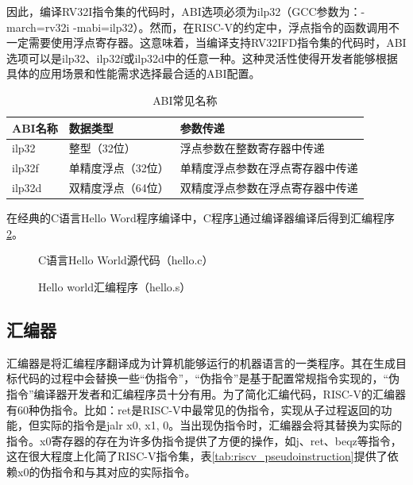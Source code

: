 因此，编译RV32I指令集的代码时，ABI选项必须为ilp32（GCC参数为：-march=rv32i -mabi=ilp32）。然而，在RISC-V的约定中，浮点指令的函数调用不一定需要使用浮点寄存器。这意味着，当编译支持RV32IFD指令集的代码时，ABI选项可以是ilp32、ilp32f或ilp32d中的任意一种。这种灵活性使得开发者能够根据具体的应用场景和性能需求选择最合适的ABI配置。

\begin{table}[htbp]
	\centering
	\caption{ABI常见名称}
	\begin{tabularx}{\textwidth}{>{\centering\arraybackslash}p{3cm} >{\centering\arraybackslash}p{5cm} >{\centering\arraybackslash}X}
		\toprule
		\textbf{ABI名称} & \textbf{数据类型} & \textbf{参数传递}    \\
		\midrule
		ilp32          & 整型（32位）       & 浮点参数在整数寄存器中传递    \\
		ilp32f         & 单精度浮点（32位）    & 单精度浮点参数在浮点寄存器中传递 \\
		ilp32d         & 双精度浮点（64位）    & 双精度浮点参数在浮点寄存器中传递 \\
		\bottomrule
	\end{tabularx}
	\label{tab:riscv_abi_state}
\end{table}

在经典的C语言Hello Word程序编译中，C程序\ref{fig:hello_c_example}通过编译器编译后得到汇编程序\ref{fig:hello_s_example}。

\begin{figure}[htbp]
	\centering
	
	\caption{C语言Hello World源代码（hello.c）}
	\label{fig:hello_c_example}
\end{figure}

\begin{figure}[htbp]
	\centering
	
	\caption{Hello world汇编程序（hello.s）}
	\label{fig:hello_s_example}
\end{figure}

\subsection{汇编器}
汇编器是将汇编程序翻译成为计算机能够运行的机器语言的一类程序。其在生成目标代码的过程中会替换一些``伪指令''，``伪指令''是基于配置常规指令实现的，``伪指令''编译器开发者和汇编程序员十分有用。为了简化汇编代码，RISC-V的汇编器有60种伪指令。比如：ret是RISC-V中最常见的伪指令，实现从子过程返回的功能，但实际的指令是jalr x0, x1, 0。当出现伪指令时，汇编器会将其替换为实际的指令。x0寄存器的存在为许多伪指令提供了方便的操作，如j、ret、beqz等指令，这在很大程度上化简了RISC-V指令集，表\ref{tab:riscv_pseudoinstruction}提供了依赖x0的伪指令和与其对应的实际指令。


